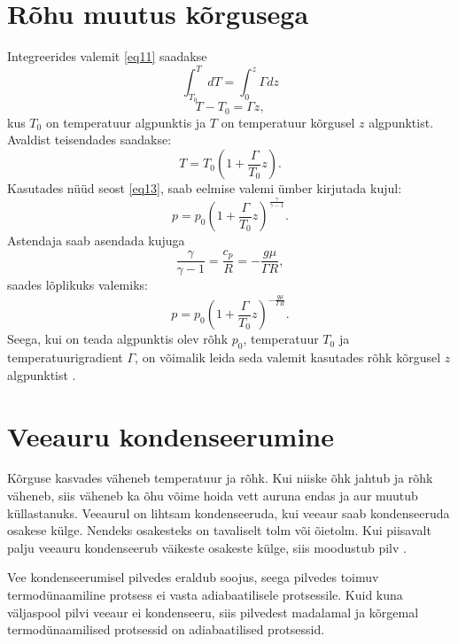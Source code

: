 \documentclass{trkut}%
\begin{document}
\section{Rõhu muutus kõrgusega }
Integreerides valemit \ref{eq11} saadakse
\begin{equation*}
\int_{T_0}^{T} dT = \int_{0}^{z} \Gamma dz
\end{equation*}
\begin{equation*}
T-T_0 = \Gamma z,
\end{equation*}
kus $T_0$ on temperatuur algpunktis ja $T$ on temperatuur kõrgusel $z$ algpunktist. Avaldist teisendades saadakse:
\begin{equation*}
T = T_0 \left(1+\frac{\Gamma}{T_0}z\right).
\end{equation*}
Kasutades nüüd seost \ref{eq13}, saab eelmise valemi ümber kirjutada kujul:
\begin{equation*}
p=p_0 \left(1+\frac{\Gamma}{T_0}z\right)^{\frac{\gamma}{\gamma-1}}.
\end{equation*}
Astendaja saab asendada kujuga
\begin{equation*}
\frac{\gamma}{\gamma-1} = \frac{c_p}{R} = -\frac{g\mu}{\Gamma R},
\end{equation*}
saades lõplikuks valemiks:
\begin{equation}\label{eq15}
p=p_0 \left(1+\frac{\Gamma}{T_0}z\right)^{ -\frac{g\mu}{\Gamma R}}.
\end{equation}
Seega, kui on teada algpunktis olev rõhk $p_0$, temperatuur $T_0$ ja temperatuurigradient $\Gamma$, on võimalik leida seda valemit kasutades rõhk kõrgusel $z$ algpunktist \parencite{Texas}.



\section{Veeauru kondenseerumine}
Kõrguse kasvades väheneb temperatuur ja rõhk. Kui niiske õhk jahtub ja rõhk väheneb, siis väheneb ka õhu võime hoida vett auruna endas ja aur muutub küllastanuks. Veeaurul on lihtsam kondenseeruda, kui veeaur saab kondenseeruda osakese külge. Nendeks osakesteks on tavaliselt tolm või õietolm. Kui piisavalt palju veeauru kondenseerub väikeste osakeste külge, siis moodustub pilv \parencite{raamat1}.

Vee kondenseerumisel pilvedes eraldub soojus, seega pilvedes toimuv termodünaamiline protsess ei vasta adiabaatilisele protsessile. Kuid kuna väljaspool pilvi veeaur ei kondenseeru, siis pilvedest madalamal ja kõrgemal termodünaamilised protsessid on adiabaatilised protsessid.
\end{document}
